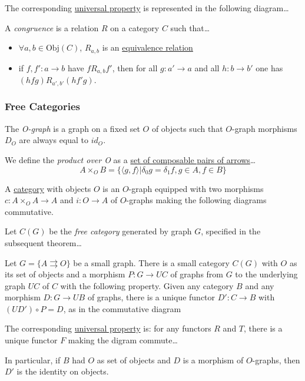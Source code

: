 \noindent The corresponding \hyperref[universality]{universal property} is represented in the following diagram\dots



\label{congruence}
A \emph{congruence} is a relation $R$ on a category $C$ such that\dots
\begin{itemize}
  \item $\forall a,b \in \text{Obj}(C)$, $R_{a,b}$ is an \hyperref[equivalencerelation]{equivalence relation}
  \item if $f,f':a \rightarrow b$ have $f R_{a,b} f'$, then for all $g: a' \rightarrow a$ and all $h: b \rightarrow b'$ one has $(hfg)R_{a',b'}(hf'g)$.
\end{itemize}

\subsubsection{Free Categories}\label{freecategories}

\label{ograph}
The \emph{O-graph} is a graph on a fixed set $O$ of objects such that $O$-graph morphisms $D_O$ are always equal to $id_O$.\newline

\noindent We define the \emph{product over O} as a \hyperref[composablepairsofarrows]{set of composable pairs of arrows}\dots
$$A \times_O B = \{ \langle g, f \rangle | \delta_0 g = \delta_1 f, g \in A, f \in B \}$$

\noindent A \hyperref[category]{category} with objects $O$ is an $O$-graph equipped with two morphisms $c:A \times_O A \rightarrow A$ and $i:O \rightarrow A$
of $O$-graphs making the following diagrams commutative.




\label{freecategory}

Let $C(G)$ be the \emph{free category} generated by graph $G$, specified in the subsequent theorem\dots

\begin{theorem}
Let $G = \{A \rightrightarrows O\}$ be a small graph. There is a small category $C(G)$ with $O$ as its set of objects and a morphism $P: G \rightarrow UC$ of graphs from $G$ to
the underlying graph $UC$ of $C$ with the following property. Given any category $B$ and any morphism $D:G \rightarrow UB$ of graphs, there is a unique functor $D':C \rightarrow B$
with $(UD') \circ P = D$, as in the commutative diagram

\noindent The corresponding \hyperref[universality]{universal property} is: for any functors $R$ and $T$, there is a unique functor $F$ making the digram commute\dots
\begin{figure}[H]
\centering

\end{figure}

In particular, if $B$ had $O$ as set of objects and $D$ is a morphism of $O$-graphs, then $D'$ is the identity on objects.
\end{theorem}

